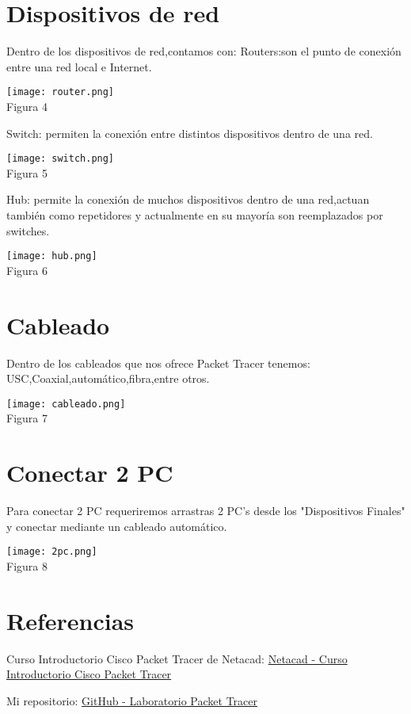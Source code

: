 \documentclass[]{article}
\begin{document}
\section{Dispositivos de red}
Dentro de los dispositivos de red,contamos con:
Routers:son el punto de conexión entre una red local e Internet.
\begin{center}
	\texttt{[image: router.png]} \\  %
	Figura 4
\end{center}
Switch: permiten la conexión entre distintos dispositivos dentro de una red.
\begin{center}
	\texttt{[image: switch.png]} \\  %
	Figura 5
\end{center}
Hub: permite la conexión de muchos dispositivos dentro de una red,actuan también como repetidores y actualmente en su mayoría son reemplazados por switches.
\begin{center}
	\texttt{[image: hub.png]} \\  %
	Figura 6
\end{center}
\section{Cableado}
Dentro de los cableados que nos ofrece Packet Tracer tenemos: USC,Coaxial,automático,fibra,entre otros.
\begin{center}
	\texttt{[image: cableado.png]} \\  %
	Figura 7
\end{center}
\section{Conectar 2 PC}
Para conectar 2 PC requeriremos arrastras 2 PC's desde los "Dispositivos Finales" y conectar mediante un cableado automático.
\begin{center}
	\texttt{[image: 2pc.png]} \\  %
	Figura 8
\end{center}
\section{Referencias}

Curso Introductorio Cisco Packet Tracer de Netacad: \href{https://www.netacad.com/launch?id=ec0847b7-e6fc-4597-bc31-38ddd6b07a2f&tab=curriculum&view=2e838579-e095-5f66-bb62-c440769a0b24}{Netacad - Curso Introductorio Cisco Packet Tracer}

Mi repositorio: \href{https://github.com/estefilungaro/Laboratorio_packet_tracer}{GitHub - Laboratorio Packet Tracer}
\end{document}
